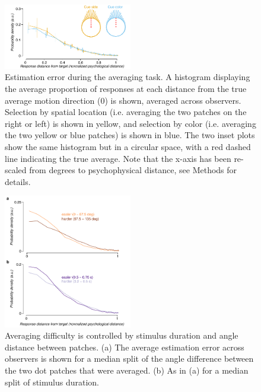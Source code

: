 \begin{figure}
\centering
\includegraphics[keepaspectratio,width=0.5\textwidth]{figs_c4/f2_aca_perf.pdf}
\caption[Estimation error during averaging]{Estimation error during the averaging task. A histogram displaying the average proportion of responses at each distance from the true average motion direction (0) is shown, averaged across observers. Selection by spatial location (i.e. averaging the two patches on the right or left) is shown in yellow, and selection by color (i.e. averaging the two yellow or blue patches) is shown in blue. The two inset plots show the same histogram but in a circular space, with a red dashed line indicating the true average. Note that the x-axis has been re-scaled from degrees to psychophysical distance, see Methods for details.}
\label{fig:c4f2}
\end{figure}

\begin{figure}
\centering
\includegraphics[keepaspectratio,width=0.5\textwidth]{figs_c4/f2_aca_parameters.pdf}
\caption[Parameters that control difficulty of averaging]{Averaging difficulty is controlled by stimulus duration and angle distance between patches. (a) The average estimation error across observers is shown for a median split of the angle difference between the two dot patches that were averaged. (b) As in (a) for a median split of stimulus duration.}
\label{fig:c4f3}
\end{figure}

